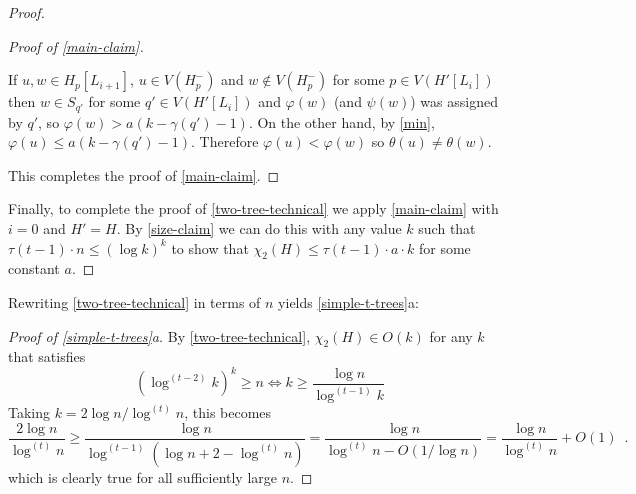 \documentclass[kpfonts]{patmorin}
\newcommand{\trn}{\chi_2}
\theoremstyle{named}
\newcommand{\weirdref}[2]{\cref{#1}#2}
\begin{document}
\begin{proof}
\begin{proof}[Proof of \cref{main-claim}]
\begin{compactenum}
        \item If $u,w\in H_p[L_{i+1}]$, $u\in V(H^-_{p})$ and $w\not\in V(H^-_{p})$ for some $p\in V(H'[L_i])$ then $w\in S_{q'}$ for some $q'\in V(H'[L_i])$ and $\varphi(w)$ (and $\psi(w)$) was assigned by $q'$, so $\varphi(w)>a(k-\gamma(q')-1)$. On the other hand, by \cref{min}, $\varphi(u) \le a(k-\gamma(q')-1)$.  Therefore $\varphi(u)<\varphi(w)$ so $\theta(u)\neq\theta(w)$.
      \end{compactenum}
      This completes the proof of \cref{main-claim}.
    \end{proof}
    Finally, to complete the proof of \cref{two-tree-technical} we apply \cref{main-claim} with $i=0$ and $H'=H$.  By \cref{size-claim} we can do this with any value $k$ such that $\tau(t-1)\cdot n \le (\log k)^{k}$ to show that $\trn(H)\le \tau(t-1)\cdot a\cdot k$ for some constant $a$.
\end{proof}

Rewriting \cref{two-tree-technical} in terms of $n$ yields \weirdref{simple-t-trees}{a}:

\begin{proof}[Proof of \weirdref{simple-t-trees}{a}]
    By \cref{two-tree-technical}, $\trn(H)\in O(k)$ for any $k$ that satisfies
    \[  (\log^{(t-2)} k)^{k} \ge n \Leftrightarrow
        k \ge \frac{\log n}{\log^{(t-1)} k}
    \]
    Taking $k=2\log n/\log^{(t)} n$, this becomes
    \[
        \frac{2\log n}{\log^{(t)} n}
        \ge \frac{\log n}{\log^{(t-1)}(\log n + 2 -\log^{(t)} n)}
        = \frac{\log n}{\log^{(t)} n - O(1/\log n)}
        = \frac{\log n}{\log^{(t)} n}+O(1) \enspace .
    \]
    which is clearly true for all sufficiently large $n$.
\end{proof}
\end{document}
